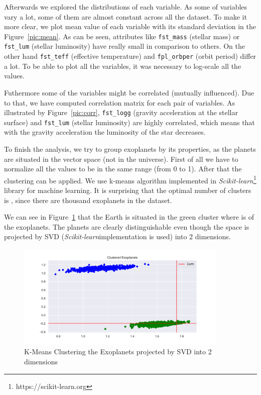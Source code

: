 \documentclass[12p]{article}
\begin{document}
Afterwards we explored the distributions of each variable. As some of variables vary a lot, some of them are almost constant across all the dataset. To make it more clear, we plot mean value of each variable with its standard deviation in the Figure~\ref{pic:mean}. As can be seen, attributes like \verb|fst_mass| (stellar mass) or \verb|fst_lum| (stellar luminosity) have really small in comparison to others. On the other hand \verb|fst_teff| (effective temperature) and \verb|fpl_orbper| (orbit period) differ a lot. To be able to plot all the variables, it was necessary to log-scale all the values. 

Futhermore some of the variables might be correlated (mutually influenced). Due to that, we have computed correlation matrix for each pair of variables. As illustrated by Figure~\ref{pic:corr}, \verb|fst_logg| (gravity acceleration at the stellar surface) and \verb|fst_lum| (stellar luminosity) are highly correlated, which means that with the gravity acceleration the luminosity of the star decreases.

To finish the analysis, we try to group exoplanets by its properties, as the planets are situated in the vector space (not in the universe). First of all we have to normalize all the values to be in the same range (from 0 to 1). After that the clustering can be applied. We use k-means algorithm implemented in \textit{Scikit-learn}\footnote{https://scikit-learn.org} library for machine learning. It is surprising that the optimal number of clusters is , since there are  thousand exoplanets in the dataset.

We can see in Figure~\ref{pic:cluster} that the Earth is situated in the green cluster where is  of the exoplanets. The planets are clearly distinguishable even though the space is projected by SVD (\textit{Scikit-learn}\footnotemark[\value{footnote}] implementation is used) into 2 dimensions.

\begin{figure}\centering
    \includegraphics[width=0.9\textwidth]{graphics/cluster.pdf}
    \caption{K-Means Clustering the Exoplanets projected by SVD into 2 dimensions}
    \label{pic:cluster}
\end{figure}
\end{document}

